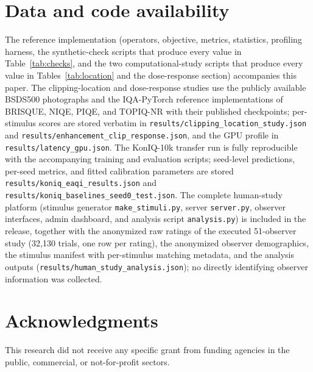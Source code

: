 \documentclass[5p,times,twocolumn]{elsarticle}
\begin{document}
\section*{Data and code availability}

The reference implementation (operators, objective, metrics, statistics,
profiling harness, the synthetic-check scripts that produce every value in
Table~\ref{tab:checks}, and the two computational-study scripts that produce
every value in Tables~\ref{tab:location} and the dose-response section)
accompanies this paper. The clipping-location and dose-response studies use
the publicly available BSDS500 photographs and the IQA-PyTorch reference
implementations of BRISQUE, NIQE, PIQE, and TOPIQ-NR with their published
checkpoints; per-stimulus scores are stored verbatim in
\texttt{results/clipping\_location\_study.json} and
\texttt{results/enhancement\_clip\_response.json}, and the GPU profile in
\texttt{results/latency\_gpu.json}. The KonIQ-10k transfer run is fully
reproducible with the accompanying training and evaluation scripts; seed-level
predictions, per-seed metrics, and fitted calibration parameters are stored
\texttt{results/koniq\_eaqi\_results.json} and
\texttt{results/koniq\_baselines\_seed0\_test.json}. The complete human-study
platform (stimulus generator \texttt{make\_stimuli.py}, server
\texttt{server.py}, observer interfaces, admin dashboard, and analysis script
\texttt{analysis.py}) is included in the release, together with the
anonymized raw ratings of the executed 51-observer study (32{,}130 trials,
one row per rating), the anonymized observer demographics, the stimulus
manifest with per-stimulus matching metadata, and the analysis outputs
(\texttt{results/human\_study\_analysis.json}); no directly identifying
observer information was collected.

\section*{Acknowledgments}

This research did not receive any specific grant from funding agencies in the
public, commercial, or not-for-profit sectors.



\end{document}
